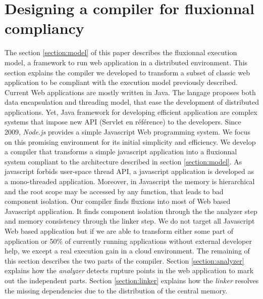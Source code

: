 \section{Designing a compiler for fluxionnal compliancy} \label{section:compiler}

The section \ref{section:model} of this paper describes the fluxionnal execution model, a framework to run web application in a distributed environment.
This section explains the compiler we developed to transform a subset of classic web application to be compliant with the execution model previously described.
Current Web applications are mostly written in Java. The langage proposes both data encapsulation and threading model, that ease the development of distributed applications. Yet, Java framework for developing efficient application are complex systems that impose new API (Servlet en référence) to the developers. Since 2009, \textit{Node.js} provides a simple Javascript Web programming system. We focus on this promising environment for its initial simplicity and efficiency. We develop a compiler that transforms a simple javascript application into a fluxionnal system compliant to the architecture described in section \ref{section:model}.
As javascript forbids user-space thread API, a javascript application is developed as a mono-threaded application. Moreover, in Javascript  the memory is hierarchical and the root scope may be accessed by any function, that leads to bad component isolation. Our compiler finds fluxions into most of Web based Javascript application. It finds component isolation through the the analyzer step and memory consistency through the linker step. We do not target all Javascript Web based application but if we are able to transform either some part of application or 50\% of currently running applications without external developer help, we except a real execution gain in a cloud environment. 
The remaining of this section describes the two parts of the compiler.
Section \ref{section:analyzer} explains how the \textit{analyzer} detects rupture points in the web application to mark out the independent parts.
Section \ref{section:linker} explains how the \textit{linker} resolves the missing dependencies due to the distribution of the central memory.

